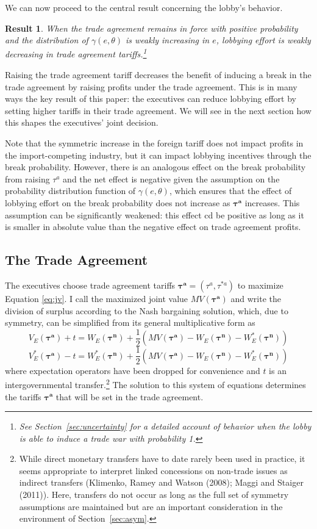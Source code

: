 \documentclass[10pt]{article}
\newtheorem{result}{Result}
\newcommand{\ta}{\theta}
\newcommand{\bta}{\bm{\tau^a}}
\newcommand{\btn}{\bm{\tau^n}}
\newcommand{\ga}{\gamma}
\begin{document}
We can now proceed to the central result concerning the lobby's behavior. 
\begin{result}
  When the trade agreement remains in force with positive probability and the distribution of $\ga(e,\ta)$ is weakly increasing in $e$, lobbying effort is weakly decreasing in trade agreement tariffs.\footnote{See Section~\ref{sec:uncertainty} for a detailed account of behavior when the lobby is able to induce a trade war with probability 1.}
  \label{res:lobby}
\end{result}

\noindent Raising the trade agreement tariff decreases the benefit of inducing a break in the trade agreement by raising profits under the trade agreement. This is in many ways the key result of this paper: the executives can reduce lobbying effort by setting higher tariffs in their trade agreement. We will see in the next section how this shapes the executives' joint decision. 

Note that the symmetric increase in the foreign tariff does not impact profits in the import-competing industry, but it can impact lobbying incentives through the break probability. However, there is an analogous effect on the break probability from raising $\tau^a$ and the net effect is negative given the assumption on the probability distribution function of $\ga(e,\ta)$, which ensures that the effect of lobbying effort on the break probability does not increase as $\bta$ increases. This assumption can be significantly weakened: this effect cd be positive as long as it is smaller in absolute value than the negative effect on trade agreement profits.



\subsection{The Trade Agreement}
\label{sec:ta}
The executives choose trade agreement tariffs $\bta=\left(\tau^a,\tau^{*a} \right)$ to maximize Equation \ref{eq:jv}. I call the maximized joint value $MV(\bta)$ and write the division of surplus according to the Nash bargaining solution, which, due to symmetry, can be simplified from its general multiplicative form as
\[
  V_E(\bta) + t = W_E(\btn) + \frac{1}{2} \left( MV(\bta) - W_E(\btn) - W_E^*(\btn) \right)
\]
\[
  V_E^*(\bta) - t = W_E^*(\btn) + \frac{1}{2} \left( MV(\bta) - W_E(\btn) - W_E^*(\btn) \right)
\]
where expectation operators have been dropped for convenience and $t$ is an intergovernmental transfer.\footnote{While direct monetary transfers have to date rarely been used in practice, it seems appropriate to interpret linked concessions on non-trade issues as indirect transfers (Klimenko, Ramey and Watson (2008); Maggi and Staiger (2011)). Here, transfers do not occur as long as the full set of symmetry assumptions are maintained but are an important consideration in the environment of Section~\ref{sec:asym}.} The solution to this system of equations determines the tariffs $\bta$ that will be set in the trade agreement.
\end{document}
